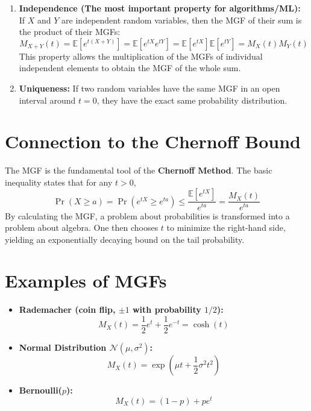 \documentclass[11pt]{article}
\begin{document}
\begin{enumerate}
    \item \textbf{Independence (The most important property for algorithms/ML):}
    If \(X\) and \(Y\) are independent random variables, then the MGF of their sum is the product of their MGFs:
    \[
 M_{X+Y}(t) = \mathbb{E}[e^{t(X+Y)}] = \mathbb{E}[e^{tX}e^{tY}] = \mathbb{E}[e^{tX}]\mathbb{E}[e^{tY}] = M_X(t) M_Y(t) 
\]
    This property allows the multiplication of the MGFs of individual independent elements to obtain the MGF of the whole sum.

    \item \textbf{Uniqueness:}
    If two random variables have the same MGF in an open interval around \(t=0\), they have the exact same probability distribution.
\end{enumerate}

\hrulefill

\section{Connection to the Chernoff Bound}

The MGF is the fundamental tool of the \textbf{Chernoff Method}. The basic inequality states that for any \(t > 0\),
\[
 \Pr(X \ge a) = \Pr(e^{tX} \ge e^{ta}) \le \frac{\mathbb{E}[e^{tX}]}{e^{ta}} = \frac{M_X(t)}{e^{ta}} 
\]
By calculating the MGF, a problem about probabilities is transformed into a problem about algebra. One then chooses \(t\) to minimize the right-hand side, yielding an exponentially decaying bound on the tail probability.

\hrulefill

\section{Examples of MGFs}

\begin{itemize}
    \item \textbf{Rademacher (coin flip, \(\pm 1\) with probability \(1/2\)):}
    \[
 M_X(t) = \frac{1}{2}e^t + \frac{1}{2}e^{-t} = \cosh(t) 
\]
    \item \textbf{Normal Distribution \(\mathcal{N}(\mu, \sigma^2)\):}
    \[
 M_X(t) = \exp\left(\mu t + \frac{1}{2}\sigma^2 t^2\right) 
\]
    \item \textbf{Bernoulli(\(p\)):}
    \[
 M_X(t) = (1-p) + p e^t 
\]
\end{itemize}

\hrulefill
\end{document}
